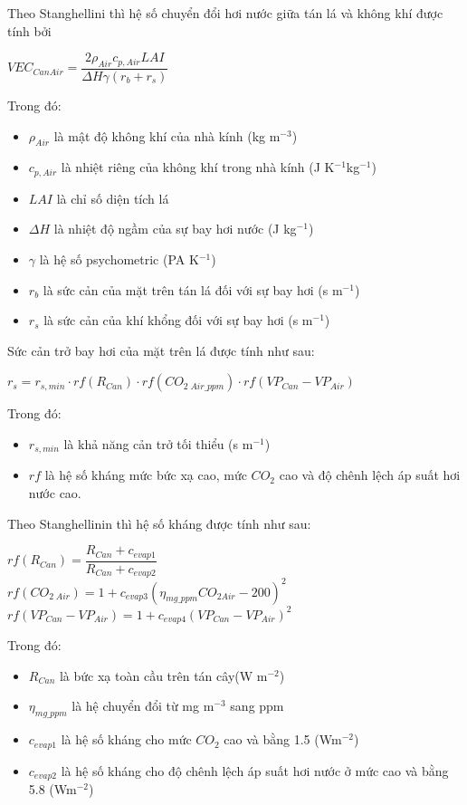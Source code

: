 \documentclass[a4paper]{article}
\begin{document}
    Theo Stanghellini thì hệ số chuyển đổi hơi nước giữa tán lá và không khí được tính bởi
    \begin{center}
        $VEC_{CanAir} = \dfrac{2\rho_{Air}c_{p,Air}LAI}{\Delta H \gamma(r_b + r_s)}$
    \end{center}
    Trong đó:
    \begin{itemize}
        \item $\rho_{Air}$ là mật độ không khí của nhà kính (kg m$^{-3}$)
        \item $c_{p,Air}$ là nhiệt riêng của không khí trong nhà kính (J K$^{-1}$kg$^{-1}$)
        \item $LAI$ là chỉ số diện tích lá 
        \item $\Delta H$ là nhiệt độ ngầm của sự bay hơi nước (J kg$^{-1}$)
        \item $\gamma$ là hệ số psychometric (PA K$^{-1}$)
        \item $r_b$ là sức cản của mặt trên tán lá đối với sự bay hơi (s m$^{-1}$)
        \item $r_s$ là sức cản của khí khổng đối với sự bay hơi (s m$^{-1}$)
    \end{itemize}
    
    Sức cản trở bay hơi của mặt trên lá được tính như sau:
    \begin{center}
        $r_s = r_{s, min} \cdot rf(R_{Can}) \cdot rf(CO_{2\;Air\_ppm}) \cdot 
        rf(VP_{Can} - VP_{Air})$
    \end{center}
    Trong đó:
    \begin{itemize}
        \item $r_{s, min}$ là khả năng cản trở tối thiểu  (s m$^{-1}$)
        \item $rf$ là hệ số kháng mức bức xạ cao, mức $CO_2$ cao và độ chênh lệch áp suất hơi nước cao.
    \end{itemize}
    
    Theo Stanghellinin thì hệ số kháng được tính như sau:
    \begin{center}
        $rf(R_{Can}) = \dfrac{R_{Can} + c_{evap1}}{R_{Can} + c_{evap2}}$\\
        $rf(CO_{2\;Air}) = 1 + c_{evap3}(\eta_{mg\_ppm}CO_{2Air} - 200)^2$\\
        $rf(VP_{Can} - VP_{Air}) = 1 + c_{evap4}(VP_{Can} - VP_{Air})^2$ 
    \end{center}
    Trong đó:
    \begin{itemize}
        \item $R_{Can}$ là bức xạ toàn cầu trên tán cây(W m$^{-2}$)
        \item $\eta_{mg\_ppm}$ là hệ chuyển đổi từ mg m$^{-3}$ sang ppm
        \item $c_{evap1}$ là hệ số kháng cho mức $CO_2$ cao và bằng 1.5 (Wm$^{-2}$)
        \item $c_{evap2}$ là hệ số kháng cho độ chênh lệch áp suất hơi nước ở mức cao và bằng 5.8 (Wm$^{-2}$)
    \end{itemize}
    
\end{document}
